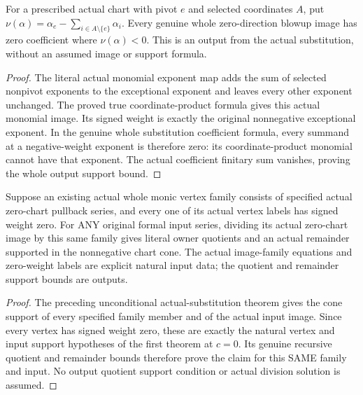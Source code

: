 \begin{theorem}
\label{hir:actual-zero-chart-signed-support-cone}
\leanok
For a prescribed actual chart with pivot $e$ and selected coordinates $A$,
put $\nu(\alpha)=\alpha_e-\sum_{i\in A\setminus\{e\}}\alpha_i$.
Every genuine whole zero-direction blowup image has zero coefficient
where $\nu(\alpha)<0$. This is an output from the actual substitution,
without an assumed image or support formula.
\end{theorem}
\begin{proof}
The literal actual monomial exponent map adds the sum of selected nonpivot
exponents to the exceptional exponent and leaves every other exponent
unchanged. The proved true coordinate-product formula gives this actual
monomial image. Its signed weight is exactly the original nonnegative
exceptional exponent. In the genuine whole substitution coefficient
formula, every summand at a negative-weight exponent is therefore zero:
its coordinate-product monomial cannot have that exponent. The actual
coefficient finitary sum vanishes, proving the whole output support bound.
\end{proof}

\begin{theorem}
\label{hir:actual-image-family-owner-division-signed-cone}
\leanok
Suppose an existing actual whole monic vertex family consists of specified
actual zero-chart pullback series, and every one of its actual vertex labels
has signed weight zero. For ANY original formal input series, dividing its
actual zero-chart image by this same family gives literal owner quotients
and an actual remainder supported in the nonnegative chart cone.
The actual image-family equations and zero-weight labels are explicit natural
input data; the quotient and remainder support bounds are outputs.
\end{theorem}
\begin{proof}
The preceding unconditional actual-substitution theorem gives the cone
support of every specified family member and of the actual input image.
Since every vertex has signed weight zero, these are exactly the natural
vertex and input support hypotheses of the first theorem at $c=0$.
Its genuine recursive quotient and remainder bounds therefore prove the
claim for this SAME family and input. No output quotient support condition
or actual division solution is assumed.
\end{proof}


